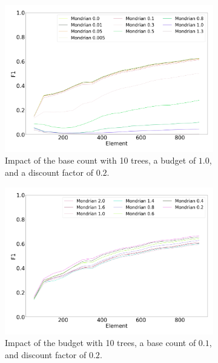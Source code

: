 \begin{figure}
	 \centering
	 \begin{subfigure}[b]{0.49\textwidth}
		\centering
		\includegraphics[width=\textwidth]{figures/calibration_mondrian_base.png}
		\caption{Impact of the base count with 10 trees, a budget of $1.0$, and a discount factor of $0.2$.} 
		\label{fig:mondrian-base-count}
	\end{subfigure}
	\hfill
	 \begin{subfigure}[b]{0.49\textwidth}
		 \centering
		 \includegraphics[width=\textwidth]{figures/calibration_mondrian_lifetime.png}
		 \caption{Impact of the budget with 10 trees, a base count of $0.1$, and discount factor of $0.2$.}
		 \label{fig:mondrian-budget}
	 \end{subfigure}
	 \hfill
		\vskip 0.15cm
	 \begin{subfigure}[b]{0.49\textwidth}

\end{subfigure}
\end{figure}

